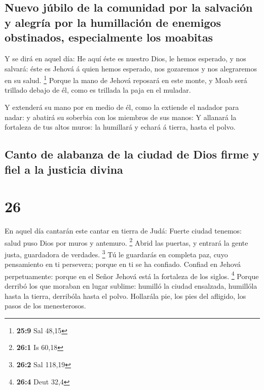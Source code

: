 \hypertarget{nuevo-juxfabilo-de-la-comunidad-por-la-salvaciuxf3n-y-alegruxeda-por-la-humillaciuxf3n-de-enemigos-obstinados-especialmente-los-moabitas}{%
\subsection{Nuevo júbilo de la comunidad por la salvación y alegría por
la humillación de enemigos obstinados, especialmente los
moabitas}\label{nuevo-juxfabilo-de-la-comunidad-por-la-salvaciuxf3n-y-alegruxeda-por-la-humillaciuxf3n-de-enemigos-obstinados-especialmente-los-moabitas}}

 Y se dirá en aquel día: He aquí éste es nuestro Dios, le
hemos esperado, y nos salvará: éste es Jehová á quien hemos esperado,
nos gozaremos y nos alegraremos en su salud. \footnote{\textbf{25:9} Sal
  48,15}  Porque la mano de Jehová reposará en este monte,
y Moab será trillado debajo de él, como es trillada la paja en el
muladar.

 Y extenderá su mano por en medio de él, como la extiende
el nadador para nadar: y abatirá su soberbia con los miembros de sus
manos:  Y allanará la fortaleza de tus altos muros: la
humillará y echará á tierra, hasta el polvo.

\hypertarget{canto-de-alabanza-de-la-ciudad-de-dios-firme-y-fiel-a-la-justicia-divina}{%
\subsection{Canto de alabanza de la ciudad de Dios firme y fiel a la
justicia
divina}\label{canto-de-alabanza-de-la-ciudad-de-dios-firme-y-fiel-a-la-justicia-divina}}

\hypertarget{section-25}{%
\section{26}\label{section-25}}

 En aquel día cantarán este cantar en tierra de Judá: Fuerte
ciudad tenemos: salud puso Dios por muros y antemuro. \footnote{\textbf{26:1}
  Is 60,18}  Abrid las puertas, y entrará la gente justa,
guardadora de verdades. \footnote{\textbf{26:2} Sal 118,19} 
Tú le guardarás en completa paz, cuyo pensamiento en ti persevera;
porque en ti se ha confiado.  Confiad en Jehová
perpetuamente: porque en el Señor Jehová está la fortaleza de los
siglos. \footnote{\textbf{26:4} Deut 32,4}  Porque derribó
los que moraban en lugar sublime: humilló la ciudad ensalzada, humillóla
hasta la tierra, derribóla hasta el polvo.  Hollarála pie,
los pies del afligido, los pasos de los menesterosos.


